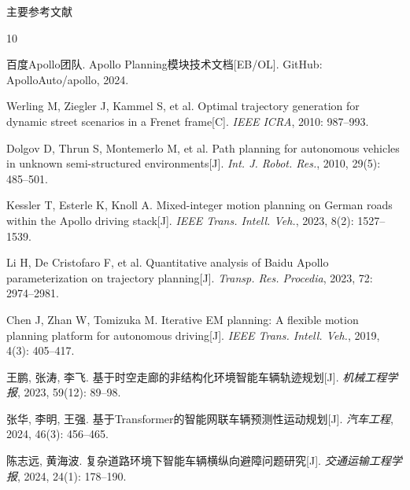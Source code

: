 \documentclass{beamer}
\begin{document}
\begin{frame}{主要参考文献}
  \begin{thebibliography}{10}
    \scriptsize
    \setlength{\itemsep}{0pt}
    \setlength{\parskip}{1pt}

    百度Apollo团队.
    Apollo Planning模块技术文档[EB/OL].
    GitHub: ApolloAuto/apollo, 2024.

    Werling M, Ziegler J, Kammel S, et al.
    Optimal trajectory generation for dynamic street scenarios in a Frenet frame[C].
    \textit{IEEE ICRA}, 2010: 987--993.

    Dolgov D, Thrun S, Montemerlo M, et al.
    Path planning for autonomous vehicles in unknown semi-structured environments[J].
    \textit{Int. J. Robot. Res.}, 2010, 29(5): 485--501.

    Kessler T, Esterle K, Knoll A.
    Mixed-integer motion planning on German roads within the Apollo driving stack[J].
    \textit{IEEE Trans. Intell. Veh.}, 2023, 8(2): 1527--1539.

    Li H, De Cristofaro F, et al.
    Quantitative analysis of Baidu Apollo parameterization on trajectory planning[J].
    \textit{Transp. Res. Procedia}, 2023, 72: 2974--2981.

    Chen J, Zhan W, Tomizuka M.
    Iterative EM planning: A flexible motion planning platform for autonomous driving[J].
    \textit{IEEE Trans. Intell. Veh.}, 2019, 4(3): 405--417.

    王鹏, 张涛, 李飞.
    基于时空走廊的非结构化环境智能车辆轨迹规划[J].
    \textit{机械工程学报}, 2023, 59(12): 89--98.

    张华, 李明, 王强.
    基于Transformer的智能网联车辆预测性运动规划[J].
    \textit{汽车工程}, 2024, 46(3): 456--465.

    陈志远, 黄海波.
    复杂道路环境下智能车辆横纵向避障问题研究[J].
    \textit{交通运输工程学报}, 2024, 24(1): 178--190.

  \end{thebibliography}
\end{frame}
\end{document}
